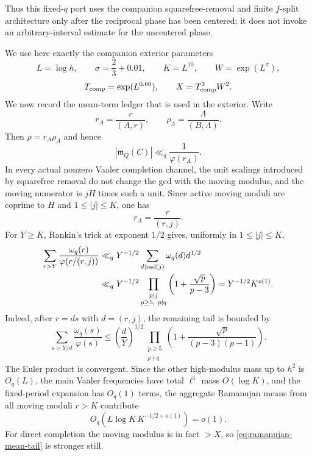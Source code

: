 \documentclass[11pt]{article}
\theoremstyle{definition}
\theoremstyle{remark}
\newcommand{\1}{\mathbf 1}
\newcommand{\ph}{\varphi}
\begin{document}
Thus this fixed-$q$ port uses the companion squarefree-removal and finite
$f$-split architecture only after the reciprocal phase has been centered; it
does not invoke an arbitrary-interval estimate for the uncentered phase.

We use here exactly the companion exterior parameters
\[
L=\log h,
\qquad \sigma=\frac23+0.01,
\qquad K=L^{10},
\qquad W=\exp(L^\sigma),
\]
\[
T_{\rm comp}=\exp(L^{0.60}),
\qquad X=T_{\rm comp}^{3}W^2.
\]
We now record the mean-term ledger that is used in the exterior.  Write
\[
r_A=\frac r{(A,r)},
\qquad
\rho_\Lambda=\frac{\Lambda}{(B,\Lambda)}.
\]
Then $\rho=r_A\rho_\Lambda$ and hence
\begin{equation}\label{eq:fixed-conductor-mean-bound}
|\mathfrak m_Q(C)|\ll_q\frac1{\ph(r_A)}.
\end{equation}
In every actual nonzero Vaaler completion channel, the unit scalings introduced
by squarefree removal do not change the gcd with the moving modulus, and the
moving numerator is $jH$ times such a unit.  Since active moving moduli are
coprime to $H$ and $1\le |j|\le K$, one has
\[
r_A=\frac r{(r,j)}.
\]
For $Y\ge K$, Rankin's trick at exponent $1/2$ gives, uniformly in
$1\le|j|\le K$,
\begin{align}
\sum_{r>Y}\frac{\omega_q(r)}{\ph(r/(r,j))}
&\ll_q
Y^{-1/2}
\sum_{d\mid\operatorname{rad}(j)}\omega_q(d)d^{1/2}\notag\\
&\ll_q
Y^{-1/2}
\prod_{\substack{p\mid j\\p\ge5,\ p\nmid q}}
\left(1+\frac{\sqrt p}{p-3}\right)
=Y^{-1/2}K^{o(1)}.
\label{eq:ramanujan-mean-tail}
\end{align}
Indeed, after $r=ds$ with $d=(r,j)$, the remaining tail is bounded by
\[
\sum_{s>Y/d}\frac{\omega_q(s)}{\ph(s)}
\le
\left(\frac dY\right)^{1/2}
\prod_{\substack{p\ge5\\p\nmid q}}
\left(1+\frac{\sqrt p}{(p-3)(p-1)}\right).
\]
The Euler product is convergent.  Since the other high-modulus mass up to
$h^2$ is $O_q(L)$, the main Vaaler frequencies have total $\ell^1$ mass
$O(\log K)$, and the fixed-period expansion has $O_q(1)$ terms, the aggregate
Ramanujan means from all moving moduli $r>K$ contribute
\begin{equation}\label{eq:ramanujan-mean-global}
O_q\!\left(L\log K\,K^{-1/2+o(1)}\right)=o(1).
\end{equation}
For direct completion the moving modulus is in fact $>X$, so
\eqref{eq:ramanujan-mean-tail} is stronger still.
\end{document}
